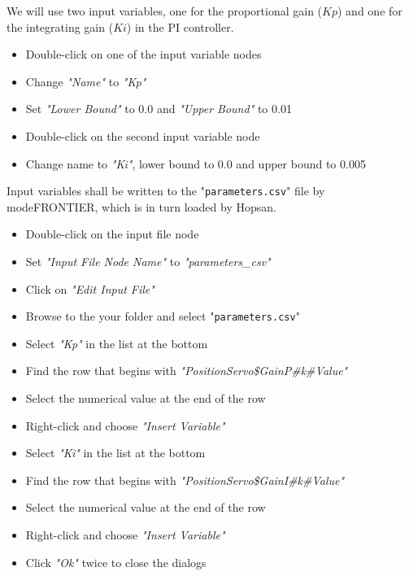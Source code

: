 \documentclass[a4paper]{article}
\begin{document}
\begin{tutenumerate}
We will use two input variables, one for the proportional gain ($Kp$) and one for the integrating gain ($Ki$) in the PI controller.
\begin{itemize}
\item Double-click on one of the input variable nodes


\item Change \textit{"Name"} to \textit{"Kp"}
\item Set \textit{"Lower Bound"} to 0.0 and \textit{"Upper Bound"} to 0.01
\item Double-click on the second input variable node
\item Change name to \textit{"Ki"}, lower bound to 0.0 and upper bound to 0.005
\end{itemize}

Input variables shall be written to the "\texttt{parameters.csv}" file by modeFRONTIER, which is in turn loaded by Hopsan.
\begin{itemize}
\item Double-click on the input file node

\item Set \textit{"Input File Node Name"} to \textit{"parameters\_csv"}
\item Click on \textit{"Edit Input File"}
\item Browse to the your folder and select "\texttt{parameters.csv}"
\item Select \textit{"Kp"} in the list at the bottom
\item Find the row that begins with \textit{"PositionServo\$GainP\#k\#Value"}
\item Select the numerical value at the end of the row
\item Right-click and choose \textit{"Insert Variable"}
\item Select \textit{"Ki"} in the list at the bottom
\item Find the row that begins with \textit{"PositionServo\$GainI\#k\#Value"}
\item Select the numerical value at the end of the row
\item Right-click and choose \textit{"Insert Variable"}
\item Click \textit{"Ok"} twice to close the dialogs
\end{itemize}


\end{tutenumerate}
\end{document}
